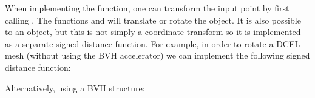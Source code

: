 \documentclass[letterpaper,10pt,english]{sphinxmanual}
\begin{document}
\sphinxAtStartPar
When implementing the  function, one can transform the input point by first calling .
The functions  and  will translate or rotate the object.
It is also possible to  an object, but this is not simply a coordinate transform so it is implemented as a separate signed distance function.
For example, in order to rotate a DCEL mesh (without using the BVH accelerator) we can implement the following signed distance function:

\begin{sphinxVerbatim}[commandchars=\\\{\}]
  
     
          
       

     
\end{sphinxVerbatim}

\sphinxAtStartPar
Alternatively, using a BVH structure:
\end{document}

